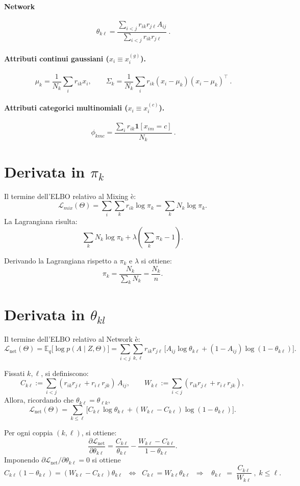 \documentclass[11pt,a4paper]{article}
\begin{document}
\paragraph{Network}
\[
\ \theta_{k\ell}=\frac{\sum_{i<j} r_{ik}r_{j\ell}A_{ij}}{\sum_{i<j} r_{ik}r_{j\ell}}\ .
\]
\paragraph{Attributi continui gaussiani ($x_i\equiv x_i^{(g)}$).}
\[
\ \mu_k=\frac{1}{N_k}\sum_i r_{ik}x_i,\qquad
\Sigma_k=\frac{1}{N_k}\sum_i r_{ik}(x_i-\mu_k)(x_i-\mu_k)^\top\ .
\]
\paragraph{Attributi categorici multinomiali ($x_i\equiv x_i^{(c)}$).}
\[
\ \phi_{kmc}=\frac{\sum_i r_{ik}\mathbf{1}[x_{im}=c]}{N_k}\ .
\]

\section{Derivata in $\pi_k$}
Il termine dell'ELBO relativo al Mixing è:\\
\[\mathcal{L}_{mix}(\Theta)=\sum_i \sum_k r_{ik}\log \pi_k=\sum_k N_k\log\pi_k.\]
La Lagrangiana risulta:
\[\sum_k N_k\log\pi_k+\lambda(\sum_k\pi_k-1).\]

Derivando la Lagrangiana rispetto a $\pi_k$ e $\lambda$ si ottiene:
\[\pi_k=\frac{N_k}{\sum_k N_k}=\frac{N_k}{n}.\]

\section{Derivata in $\theta_{kl}$}

Il termine dell'ELBO relativo al Network è:
\[
\mathcal{L}_{\text{net}}(\Theta)
= \mathbb{E}_q\!\big[\log p(A\mid Z,\Theta)\big]
= \sum_{i<j}\sum_{k,\ell} r_{ik} r_{j\ell}\,\Big[
A_{ij}\log\theta_{k\ell} + (1-A_{ij})\log(1-\theta_{k\ell})
\Big].
\]

\noindent Fissati $k,\ell$, si definiscono:
\[
C_{k\ell} := \sum_{i<j} (r_{ik}r_{j\ell}+r_{i\ell}r_{jk})\,A_{ij},
\qquad
W_{k\ell} := \sum_{i<j} (r_{ik}r_{j\ell}+r_{i\ell}r_{jk}),
\]
Allora, ricordando che $\theta_{k\ell} = \theta_{\ell k},$
\[
\mathcal{L}_{\text{net}}(\Theta)
= \sum_{k\leq \ell}\Big[
C_{k\ell}\log\theta_{k\ell} + (W_{k\ell}-C_{k\ell})\log(1-\theta_{k\ell})
\Big].
\]

Per ogni coppia $(k,\ell)$, si ottiene:
\[
\frac{\partial \mathcal{L}_{\text{net}}}{\partial \theta_{k\ell}}
= \frac{C_{k\ell}}{\theta_{k\ell}} - \frac{W_{k\ell}-C_{k\ell}}{1-\theta_{k\ell}}.
\]
Imponendo $\partial \mathcal{L}_{\text{net}}/\partial \theta_{k\ell}=0$ si ottiene
\[
C_{k\ell}(1-\theta_{k\ell})=(W_{k\ell}-C_{k\ell})\theta_{k\ell}
\;\;\Longleftrightarrow\;\;
C_{k\ell}=W_{k\ell}\theta_{k\ell}
\;\;\Longrightarrow\;\;
\;\theta_{k\ell} \;=\; \frac{C_{k\ell}}{W_{k\ell}} \;, \; k \leq \ell.
\]
\end{document}
